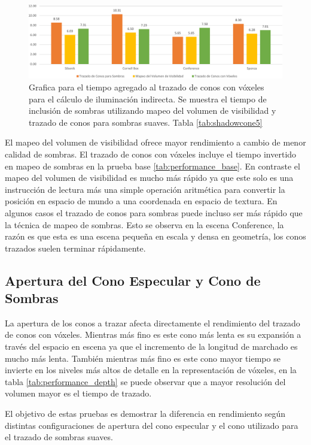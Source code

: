 \begin{figure}[H]
	\centering
	\includegraphics[width=0.95\linewidth]{media/shadowtrace_time_cropped.pdf}
	\caption{Grafica para el tiempo agregado al trazado de conos con vóxeles para el cálculo de iluminación indirecta. Se muestra el tiempo de inclusión de sombras utilizando mapeo del volumen de visibilidad y trazado de conos para sombras suaves. Tabla \ref{tab:shadowcone5}}
	\label{fig:voxeltrace_shadowing}
\end{figure}

El mapeo del volumen de visibilidad ofrece mayor rendimiento a cambio de menor calidad de sombras. El trazado de conos con vóxeles incluye el tiempo invertido en mapeo de sombras en la prueba base \ref{tab:performance_base}. En contraste el mapeo del volumen de visibilidad es mucho más rápido ya que este solo es una instrucción de lectura más una simple operación aritmética para convertir la posición en espacio de mundo a una coordenada en espacio de textura. En algunos casos el trazado de conos para sombras puede incluso ser más rápido que la técnica de mapeo de sombras. Esto se observa en la escena Conference, la razón es que esta es una escena pequeña en escala y densa en geometría, los conos trazados suelen terminar rápidamente.

\subsection{Apertura del Cono Especular y Cono de Sombras}

La apertura de los conos a trazar afecta directamente el rendimiento del trazado de conos con vóxeles. Mientras más fino es este cono más lenta es su expansión a través del espacio en escena ya que el incremento de la longitud de marchado es mucho más lenta. También mientras más fino es este cono mayor tiempo se invierte en los niveles más altos de detalle en la representación de vóxeles, en la tabla \ref{tab:performance_depth} se puede observar que a mayor resolución del volumen mayor es el tiempo de trazado.

El objetivo de estas pruebas es demostrar la diferencia en rendimiento según distintas configuraciones de apertura del cono especular y el cono utilizado para el trazado de sombras suaves.

